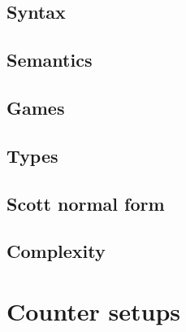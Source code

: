 \documentclass{scrbook}
\begin{document}
\section{Syntax}







\section{Semantics}






\section{Games}\label{sec:logic-games}


\section{Types}\label{sec:types}


\section{Scott normal form}\label{sec:scott-nf}


\section{Complexity}\label{sec:complexity}




\chapter{Counter setups}\label{ch:setups}

\end{document}
